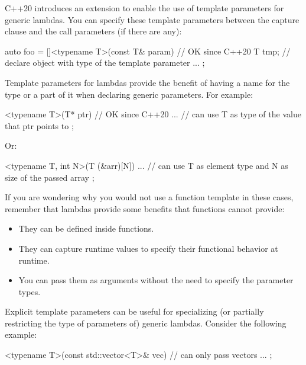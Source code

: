 

C++20 introduces an extension to enable the use of template parameters for generic lambdas. You can specify these template parameters between the capture clause and the call parameters (if there are any):

\begin{cpp}
auto foo = []<typename T>(const T& param) { // OK since C++20
				T tmp{}; // declare object with type of the template parameter
				...
			};
\end{cpp}

Template parameters for lambdas provide the benefit of having a name for the type or a part of it when declaring generic parameters. For example:

\begin{cpp}
[]<typename T>(T* ptr) { // OK since C++20
	... // can use T as type of the value that ptr points to
};
\end{cpp}

Or:

\begin{cpp}
[]<typename T, int N>(T (&arr)[N]) {
	... // can use T as element type and N as size of the passed array
};
\end{cpp}

If you are wondering why you would not use a function template in these cases, remember that lambdas provide some benefits that functions cannot provide:

\begin{itemize}
\item 
They can be defined inside functions.

\item 
They can capture runtime values to specify their functional behavior at runtime.

\item 
You can pass them as arguments without the need to specify the parameter types.
\end{itemize}



Explicit template parameters can be useful for specializing (or partially restricting the type of parameters of) generic lambdas. Consider the following example:

\begin{cpp}
[]<typename T>(const std::vector<T>& vec) { // can only pass vectors
	...
};
\end{cpp}

